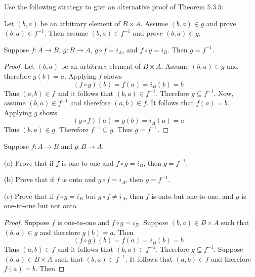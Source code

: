 \begin{tcolorbox}[title=Problem 10, breakable]
    Use the following strategy to give an alternative proof  of Theorem $5.3.5$:
    
    Let $(b, a)$ be an arbitrary element of $B \times A$.
    Assume $(b, a) \in g$ and prove $(b, a) \in f^{-1}$.
    Then assume $(b, a) \in f^{-1}$ and prove $(b, a) \in g$.
\end{tcolorbox}

\begin{theorem}
    Suppose $f : A \rightarrow B$, $g : B \rightarrow A$, $g \circ f = i_A$,
        and $f \circ g = i_B$. Then $g = f^{-1}$.
\end{theorem}

\begin{proof}
    Let $(b, a)$ be an arbitrary element of $B \times A$.
    Assume $(b, a) \in g$ and therefore $g(b) = a$.
    Applying $f$ shows 
    \[(f \circ g)(b) = f(a) = i_B(b) = b\]
    Thus $(a, b) \in f$ and it follows that $(b, a) \in f^{-1}$.
    Therefore $g \subseteq f^{-1}$.
    Now, assume $(b, a) \in f^{-1}$ and therefore $(a, b) \in f$.
    It follows that $f(a) = b$.
    Applying $g$ shows 
    \[(g \circ f)(a) = g(b) = i_A(a) = a\]
    Thus $(b, a) \in g$.
    Therefore $f^{-1} \subseteq g$.
    Thus $g = f^{-1}$.
\end{proof}

\begin{tcolorbox}[title=Problem 11, breakable]
    Suppose $f : A \rightarrow B$ and $g : B \rightarrow A$.

    (a) Prove that if $f$ is one-to-one and $f \circ g = i_B$, then $g = f^{-1}$.

    (b) Prove that if $f$ is onto and $g \circ f = i_A$, then $g = f^{-1}$.

    (c) Prove that if $f \circ g = i_B$ but $g \circ f \ne i_A$, then $f$ is onto 
        but one-to-one, and $g$ is one-to-one but not onto.
\end{tcolorbox}

\begin{proof}
    Suppose $f$ is one-to-one and $f \circ g = i_B$.
    Suppose $(b, a) \in B \times A$ such that $(b, a) \in g$
        and therefore $g(b) = a$.
    Then 
    \[(f \circ g)(b) = f(a) = i_B(b) = b\]
    Thus $(a, b) \in f$ and it follows that $(b, a) \in f^{-1}$.
    Therefore $g \subseteq f^{-1}$.
    Suppose $(b, a) \in B \times A$ such that $(b, a) \in f^{-1}$.
    It follows that $(a, b) \in f$ and therefore $f(a) = b$.
    Then 
\end{proof}

